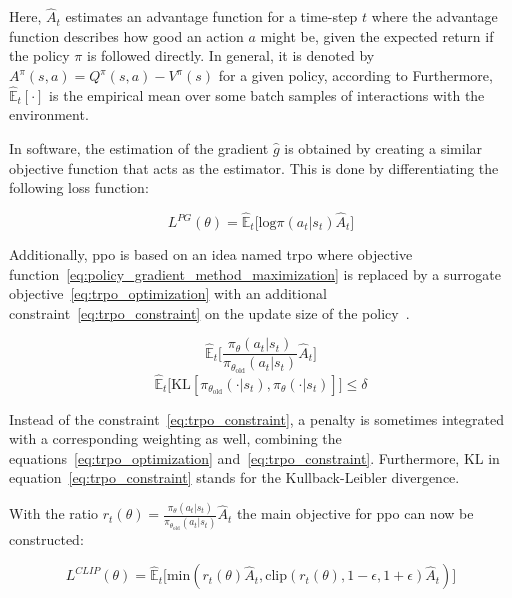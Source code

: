 \documentclass[draft,final]{vutinfth} %
\begin{document}
    Here, $\hat{A}_t$ estimates an advantage function for a time-step $t$ where the advantage function describes
    how good an action $a$ might be, given the expected return if the policy $\pi$ is followed directly.
    In general, it is denoted by $A^\pi(s,a)=Q^\pi(s,a)-V^\pi(s)$ for a given policy, according to \citeauthor{francois-lavet_introduction_2018}
    Furthermore, $\hat{\mathbb{E}}_t[\cdot]$ is the empirical mean over some batch samples of interactions with the environment.

    In software, the estimation of the gradient $\hat{g}$ is obtained by creating a similar objective function that acts as the estimator.
    This is done by differentiating the following loss function:

    \begin{equation}
        L^{PG}(\theta)=\hat{\mathbb{E}}_t\bigg [\text{log}\pi(a_t|s_t)\hat{A}_t\bigg]\label{eq:no_clip_no_penalty}
    \end{equation}

    Additionally, \gls{ppo} is based on an idea named \gls{trpo} where objective function~\ref{eq:policy_gradient_method_maximization} is replaced by a surrogate objective~\eqref{eq:trpo_optimization} with an additional constraint~\eqref{eq:trpo_constraint} on the update size of the policy~\citep{schulman_trust_2015}.

    \begin{equation}
        \hat{\mathbb{E}}_t\bigg [\frac{\pi_\theta(a_t|s_t)}{\pi_{\theta_{\text{old}}}(a_t|s_t)}\hat{A}_t\bigg]\label{eq:trpo_optimization}
    \end{equation}
    \begin{equation}
        \hat{\mathbb{E}}_t\bigg [\text{KL}[\pi_{\theta_{\text{old}}}(\cdot|s_t),\pi_{\theta}(\cdot|s_t)]\bigg]\leq\delta\label{eq:trpo_constraint}
    \end{equation}

    Instead of the constraint~\ref{eq:trpo_constraint}, a penalty is sometimes integrated with a corresponding weighting as well, combining the equations~\ref{eq:trpo_optimization} and~\ref{eq:trpo_constraint}.
    Furthermore, KL in equation~\ref{eq:trpo_constraint} stands for the Kullback-Leibler divergence.

    With the ratio $r_t(\theta)=\frac{\pi_\theta(a_t|s_t)}{\pi_{\theta_{\text{old}}}(a_t|s_t)}\hat{A}_t$ the main objective for \gls{ppo} can now be constructed:

    \begin{equation}
        L^{CLIP}(\theta)=\hat{\mathbb{E}}_t\bigg[\text{min}(r_t(\theta)\hat{A}_t,\text{clip}(r_t(\theta),1-\epsilon,1+\epsilon)\hat{A}_t)\bigg]\label{eq:ppo_clip}
    \end{equation}
\end{document}
